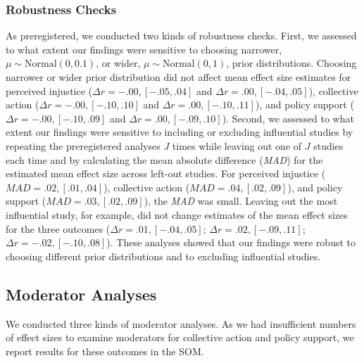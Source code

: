 \documentclass[12pt, letterpaper]{article}
\begin{document}
\hypertarget{robustness-checks}{%
\subsubsection{Robustness Checks}\label{robustness-checks}}

As preregistered, we conducted two kinds of robustness checks. First, we
assessed to what extent our findings were sensitive to choosing
narrower, \(\mu \sim \text{Normal}(0, 0.1)\), or wider,
\(\mu \sim \text{Normal}(0, 1)\), prior distributions. Choosing narrower
or wider prior distribution did not affect mean effect size estimates
for perceived injustice (\(\Delta r = -.00, [-.05, .04]\) and
\(\Delta r = .00, [-.04, .05]\)), collective action
(\(\Delta r = -.00, [-.10, .10]\) and \(\Delta r = .00, [-.10, .11]\)),
and policy support (\(\Delta r = -.00, [-.10, .09]\) and
\(\Delta r = .00, [-.09, .10]\)). Second, we assessed to what extent our
findings were sensitive to including or excluding influential studies by
repeating the preregistered analyses \(J\) times while leaving out one
of \(J\) studies each time and by calculating the mean absolute
difference (\emph{MAD}) for the estimated mean effect size across
left-out studies. For perceived injustice
(\(\textit{MAD} = .02, [.01, .04]\)), collective action
(\(\textit{MAD} = .04, [.02, .09]\)), and policy support
(\(\textit{MAD} = .03, [.02, .09]\)), the \emph{MAD} was small. Leaving
out the most influential study, for example, did not change estimates of
the mean effect sizes for the three outcomes
(\(\Delta r = .01, [-.04, .05]\); \(\Delta r = .02, [-.09, .11]\);
\(\Delta r = -.02, [-.10, .08]\)). These analyses showed that our
findings were robust to choosing different prior distributions and to
excluding influential studies.

\hypertarget{moderator-analyses}{%
\subsection{Moderator Analyses}\label{moderator-analyses}}

We conducted three kinds of moderator analyses. As we had insufficient
numbers of effect sizes to examine moderators for collective action and
policy support, we report results for these outcomes in the SOM.
\end{document}
